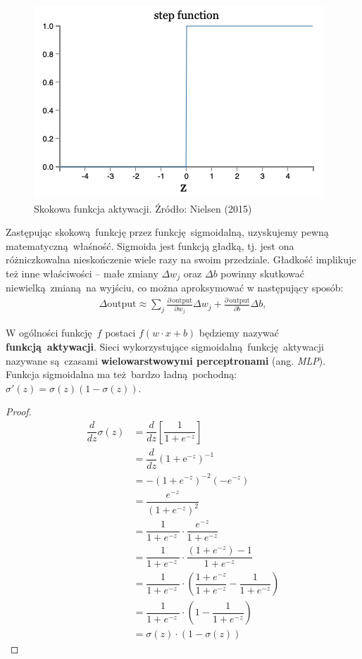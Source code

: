 \documentclass[10pt, oneside]{article}
\theoremstyle{remark}
\begin{document}
\begin{figure}[htpb]
	\centering
	\includegraphics[width=.4\linewidth]{figures/step}
	\caption{Skokowa funkcja aktywacji. Źródło: Nielsen (2015)}
	\label{fig:step}
\end{figure}

Zastępując skokową funkcję przez funkcję sigmoidalną, uzyskujemy pewną matematyczną właśność.
Sigmoida jest funkcją gładką, tj. jest ona różniczkowalna nieskończenie wiele razy na swoim przedziale.
Gładkość implikuje też inne właściwości -- małe zmiany $\Delta w_j$ oraz $\Delta b$ powinny skutkować niewielką zmianą na wyjściu, co można aproksymować w następujący sposób:
\begin{eqnarray} 
  \Delta \mbox{output} \approx \sum_j \frac{\partial \, \mbox{output}}{\partial w_j}
  \Delta w_j + \frac{\partial \, \mbox{output}}{\partial b} \Delta b,
\end{eqnarray}

W ogólności funkcję $f$ postaci $f(w \cdot x + b)$ będziemy nazywać \textbf{funkcją aktywacji}.
Sieci wykorzystujące sigmoidalną funkcję aktywacji nazywane są czasami \textbf{wielowarstwowymi perceptronami} (ang. \emph{MLP}).
Funkcja sigmoidalna ma też bardzo ładną pochodną: $\sigma'(z) = \sigma(z)(1-\sigma(z))$.
\begin{proof}
\begin{align}
\dfrac{d}{dz} \sigma(z) &= \dfrac{d}{dz} \left[ \dfrac{1}{1 + e^{-z}} \right] \\
&= \dfrac{d}{dz} \left( 1 + \mathrm{e}^{-z} \right)^{-1} \\
&= -(1 + e^{-z})^{-2}(-e^{-z}) \\
&= \dfrac{e^{-z}}{\left(1 + e^{-z}\right)^2} \\
&= \dfrac{1}{1 + e^{-z}\ } \cdot \dfrac{e^{-z}}{1 + e^{-z}}  \\
&= \dfrac{1}{1 + e^{-z}\ } \cdot \dfrac{(1 + e^{-z}) - 1}{1 + e^{-z}}  \\
&= \dfrac{1}{1 + e^{-z}\ } \cdot \left( \dfrac{1 + e^{-z}}{1 + e^{-z}} - \dfrac{1}{1 + e^{-z}} \right) \\
&= \dfrac{1}{1 + e^{-z}\ } \cdot \left( 1 - \dfrac{1}{1 + e^{-z}} \right) \\
&= \sigma(z) \cdot (1 - \sigma(z))
\end{align}
\end{proof}
\end{document}
